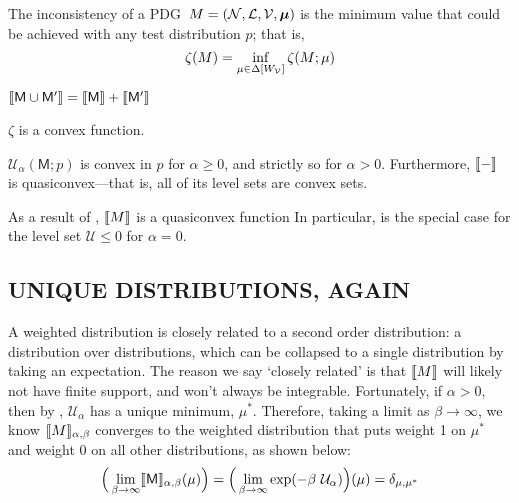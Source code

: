 \documentclass{article}
\newcommand{\bmu}{\boldsymbol{\mu}}
\newcommand{\sfM}{\mathsf M}
\newcommand{\MN}{PDG}
\numberwithin{equation}{section}
\begin{document}
\begin{notfocus}
	\begin{defn}\label{def:cont-inconsist}
		The inconsistency of a \MN\ $M = (\cal N, L, V, \bmu)$ is the minimum value that could be achieved with any test distribution $p$; that is, 
		\[ \zeta(M) = \inf_{ \mu \in \Delta [W_{\cal V}]} \zeta (M; \mu) 
		\]		
	\end{defn}
	\begin{prop}[name=\Cref{prop:union-set-semantics} analog]\label{prop:union-weight-semantics}
		$\bbr{\sfM \cup \sfM'} = \bbr{\sfM} + \bbr{\sfM'}$
	\end{prop}
	\begin{lemma}[name=\Cref{prop:convex} analog, restate=thmzetaconvex]\label{thm:zetaconvex}
		$\zeta$ is a convex function. %
	\end{lemma}
	\begin{coro}\label{cor:u-convex}
		$\mathcal{U}_\alpha(\sfM; p)$ is convex in $p$ for $\alpha \geq 0$, and strictly so for $\alpha> 0$. Furthermore, $\llbracket-\rrbracket$ is quasiconvex---that is, all of its level sets are convex sets.
	\end{coro}

	As a result of , $\llbracket M\rrbracket$ is a quasiconvex function 
	In particular,  is the special case for the level set $\mathcal U \leq 0$ for $\alpha = 0$. 
	

	\subsection{UNIQUE DISTRIBUTIONS, AGAIN}\label{sec:uniq-dist-semantics-2}
	
	A weighted distribution is closely related to a second order distribution: a distribution over distributions, which can be collapsed to a single distribution by taking an expectation.
	The reason we say `closely related' is that $\llbracket M\rrbracket$ will likely not have finite support, and won't always be integrable. Fortunately, if $\alpha > 0$, then by , $\mathcal U_\alpha$ has a unique minimum, $\mu^*$. Therefore, taking a limit as $\beta \to \infty$, we know $\llbracket M\rrbracket_{\alpha,\beta}$ converges to the weighted distribution that puts weight 1 on $\mu^*$ and weight 0 on all other distributions, as shown below:
	\[ \Big(\lim_{\beta \to \infty} \bbr{\sfM}_{\alpha,\beta}(\mu) \Big)  = \Big(\lim_{\beta \to \infty} \exp(-\beta\ \mathcal U_\alpha) \Big)(\mu) = \delta_{\mu, \mu^*} \]
	

\end{notfocus}
\end{document}
